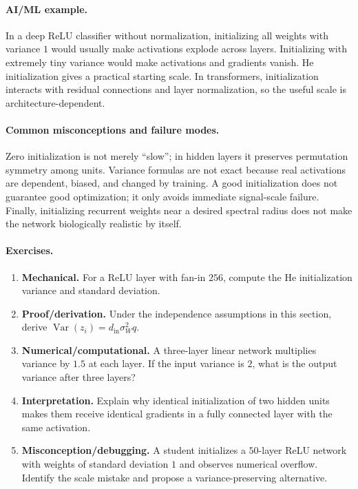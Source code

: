 \paragraph{AI/ML example.}
In a deep ReLU classifier without normalization, initializing all weights with variance \(1\) would usually make activations explode across layers. Initializing with extremely tiny variance would make activations and gradients vanish. He initialization gives a practical starting scale. In transformers, initialization interacts with residual connections and layer normalization, so the useful scale is architecture-dependent.

\paragraph{Common misconceptions and failure modes.}
Zero initialization is not merely ``slow''; in hidden layers it preserves permutation symmetry among units. Variance formulas are not exact because real activations are dependent, biased, and changed by training. A good initialization does not guarantee good optimization; it only avoids immediate signal-scale failure. Finally, initializing recurrent weights near a desired spectral radius does not make the network biologically realistic by itself.

\paragraph{Exercises.}
\begin{enumerate}[label=\textbf{39.2.\arabic*.}, leftmargin=*]
\item \textbf{Mechanical.} For a ReLU layer with fan-in \(256\), compute the He initialization variance and standard deviation.
\item \textbf{Proof/derivation.} Under the independence assumptions in this section, derive \(\operatorname{Var}(z_i)=d_{\mathrm{in}}\sigma_W^2q\).
\item \textbf{Numerical/computational.} A three-layer linear network multiplies variance by \(1.5\) at each layer. If the input variance is \(2\), what is the output variance after three layers?
\item \textbf{Interpretation.} Explain why identical initialization of two hidden units makes them receive identical gradients in a fully connected layer with the same activation.
\item \textbf{Misconception/debugging.} A student initializes a \(50\)-layer ReLU network with weights of standard deviation \(1\) and observes numerical overflow. Identify the scale mistake and propose a variance-preserving alternative.
\end{enumerate}

